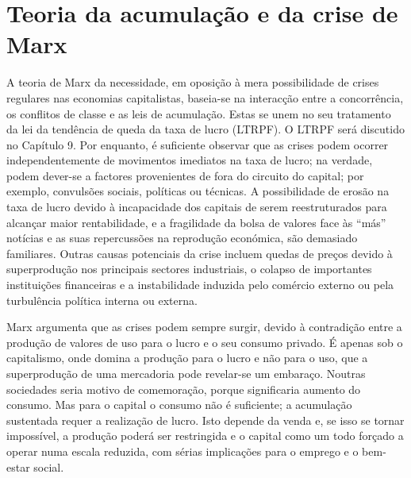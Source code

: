 \section{Teoria da acumulação e da crise de Marx}
 \par 
A teoria de Marx da necessidade, em oposição à mera possibilidade de crises regulares nas economias capitalistas, baseia-se na interacção entre a concorrência, os conflitos de classe e as leis de acumulação. Estas se unem no seu tratamento da lei da tendência de queda da taxa de lucro (LTRPF). O LTRPF será discutido no Capítulo {\color{blue}9}. Por enquanto, é suficiente observar que as crises podem ocorrer independentemente de movimentos imediatos na taxa de lucro; na verdade, podem dever-se a factores provenientes de fora do circuito do capital; por exemplo, convulsões sociais, políticas ou técnicas. A possibilidade de erosão na taxa de lucro devido à incapacidade dos capitais de serem reestruturados para alcançar maior rentabilidade, e a fragilidade da bolsa de valores face às “más” notícias e as suas repercussões na reprodução económica, são demasiado familiares. Outras causas potenciais da crise incluem quedas de preços devido à superprodução nos principais sectores industriais, o colapso de importantes instituições financeiras e a instabilidade induzida pelo comércio externo ou pela turbulência política interna ou externa.
 \par 
Marx argumenta que as crises podem sempre surgir, devido à contradição entre a produção de valores de uso para o lucro e o seu consumo privado. É apenas sob o capitalismo, onde domina a produção para o lucro e não para o uso, que a superprodução de uma mercadoria pode revelar-se um embaraço. Noutras sociedades seria motivo de comemoração, porque significaria aumento do consumo. Mas para o capital o consumo não é suficiente; a acumulação sustentada requer a realização de lucro. Isto depende da venda e, se isso se tornar impossível, a produção poderá ser restringida e o capital como um todo forçado a operar numa escala reduzida, com sérias implicações para o emprego e o bem-estar social.
 \par 
